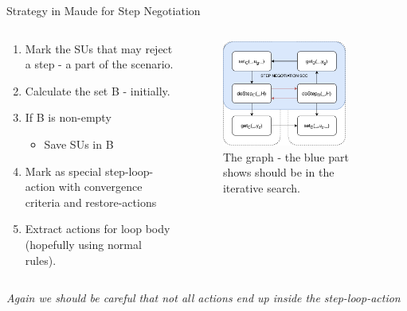 \documentclass{beamer}
\begin{document}
\begin{frame}{Strategy in Maude for Step Negotiation}
    \begin{columns}[T] 
        \begin{column}{.48\textwidth}
            \begin{enumerate}
                \item Mark the SUs that may reject a step - a part of the scenario.
                \item Calculate the set B - initially.
                \item If B is non-empty
                \begin{itemize}
                    \item Save SUs in B
                \end{itemize}
                \item Mark as special step-loop-action with convergence criteria and restore-actions
                \item Extract actions for loop body (hopefully using normal rules).
            \end{enumerate}  
        \end{column}
    \hfill%
        \begin{column}{.48\textwidth}
            \begin{figure}    
                \includegraphics[width=0.8\textwidth]{images/step_scenario_graph.pdf}
                \caption{The graph - the blue part shows should be in the iterative search.}
            \end{figure}  
        \end{column}
    \end{columns}
    \emph{Again we should be careful that not all actions end up inside the step-loop-action}
\end{frame}
\end{document}
